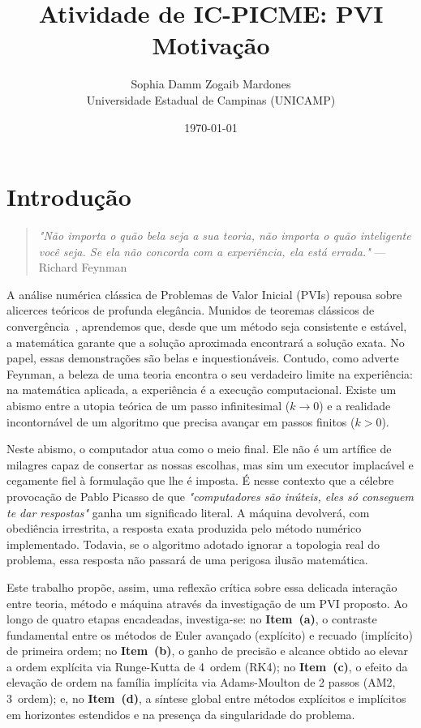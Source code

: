 \documentclass[12pt, a4paper]{article}
\title{\vspace{-2cm}\textbf{Atividade de IC-PICME: PVI Motivação}}
\author{
    Sophia Damm Zogaib Mardones \\
    \small Universidade Estadual de Campinas (UNICAMP) 
}
\date{\today}
\begin{document}
\maketitle

\tableofcontents

\section{Introdução}
\label{sec:introducao}

\begin{quote}
\textit{"Não importa o quão bela seja a sua teoria, não importa o quão inteligente
você seja. Se ela não concorda com a experiência, ela está errada."} — Richard
Feynman
\end{quote}

A análise numérica clássica de Problemas de Valor Inicial (PVIs) repousa sobre
alicerces teóricos de profunda elegância.
Munidos de teoremas clássicos de convergência~\cite{leveque2007,suli2003}, aprendemos
que, desde que um método seja consistente e
estável, a matemática garante que a solução aproximada encontrará a solução exata. No
papel, essas demonstrações são belas e
inquestionáveis. Contudo, como adverte Feynman, a beleza de uma teoria encontra o seu
verdadeiro limite na experiência:
na matemática aplicada, a experiência é a execução computacional. 
Existe um abismo entre a utopia teórica de um passo infinitesimal ($k \to 0$) e a
realidade incontornável de um algoritmo que
precisa avançar em passos finitos ($k > 0$).

Neste abismo, o computador atua como o meio final. Ele não é um artífice de milagres
capaz de consertar as nossas escolhas, mas
sim um executor implacável e cegamente fiel à formulação que lhe é imposta. 
É nesse contexto que a célebre provocação de Pablo Picasso de que
\textit{"computadores são inúteis, eles só conseguem te dar respostas"} ganha um
significado literal.
A máquina devolverá, com obediência irrestrita, a resposta exata produzida pelo
método numérico implementado. Todavia, se o algoritmo adotado ignorar a topologia
real do problema, essa resposta não passará de uma perigosa ilusão matemática.

Este trabalho propõe, assim, uma reflexão crítica sobre essa delicada interação entre
teoria, método e máquina através da investigação de um PVI proposto.
Ao longo de quatro etapas encadeadas, investiga-se: no \textbf{Item~(a)}, o contraste fundamental entre os métodos de Euler avançado (explícito) e recuado (implícito) de primeira ordem; no \textbf{Item~(b)}, o ganho de precisão e alcance obtido ao elevar a ordem explícita via Runge-Kutta de 4\textordfeminine~ordem (RK4); no \textbf{Item~(c)}, o efeito da elevação de ordem na família implícita via Adams-Moulton de 2 passos (AM2, 3\textordfeminine~ordem); e, no \textbf{Item~(d)}, a síntese global entre métodos explícitos e implícitos em horizontes estendidos e na presença da singularidade do problema.
\end{document}
